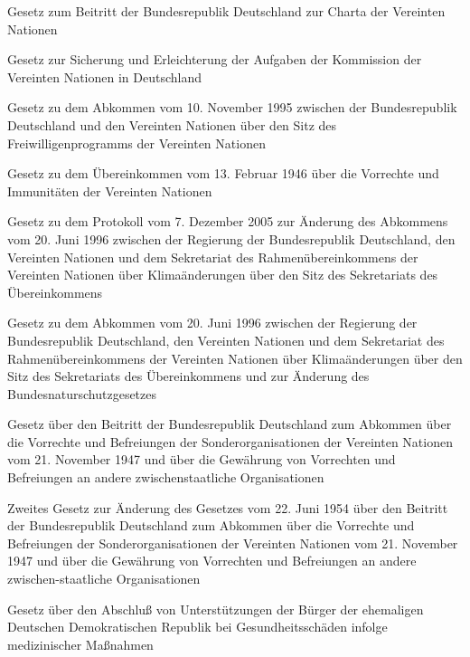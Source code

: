 \item[{UNChG}] Gesetz zum Beitritt der Bundesrepublik Deutschland zur Charta der Vereinten Nationen

\item[{UNErlG}] Gesetz zur Sicherung und Erleichterung der Aufgaben der Kommission der Vereinten Nationen in Deutschland

\item[{UNFreiwProgrAbkG}] Gesetz zu dem Abkommen vom 10. November 1995 zwischen der Bundesrepublik Deutschland und den Vereinten Nationen über den Sitz des Freiwilligenprogramms der Vereinten Nationen

\item[{UNOImmÜbkG}] Gesetz zu dem Übereinkommen vom 13. Februar 1946 über die Vorrechte und Immunitäten der Vereinten Nationen

\item[{UNSekrSitzAbkÄndProtG}] Gesetz zu dem Protokoll vom 7. Dezember 2005 zur Änderung des Abkommens vom 20. Juni 1996 zwischen der Regierung der Bundesrepublik Deutschland, den Vereinten Nationen und dem Sekretariat des Rahmenübereinkommens der Vereinten Nationen über Klimaänderungen über den Sitz des Sekretariats des Übereinkommens

\item[{UNSekrSitzAbkG}] Gesetz zu dem Abkommen vom 20. Juni 1996 zwischen der Regierung der Bundesrepublik Deutschland, den Vereinten Nationen und dem Sekretariat des Rahmenübereinkommens der Vereinten Nationen über Klimaänderungen über den Sitz des Sekretariats des Übereinkommens und zur Änderung des Bundesnaturschutzgesetzes

\item[{UNSOrgVorRAbkG}] Gesetz über den Beitritt der Bundesrepublik Deutschland zum Abkommen über die Vorrechte und Befreiungen der Sonderorganisationen der Vereinten Nationen vom 21. November 1947 und über die Gewährung von Vorrechten und Befreiungen an andere zwischenstaatliche Organisationen

\item[{UNSOrgVorRAbkGÄndG-2}] Zweites Gesetz zur Änderung des Gesetzes vom 22. Juni 1954 über den Beitritt der Bundesrepublik Deutschland zum Abkommen über die Vorrechte und Befreiungen der Sonderorganisationen der Vereinten Nationen vom 21. November 1947 und über die Gewährung von Vorrechten und Befreiungen an andere zwischen-staatliche Organisationen

\item[{UntAbschlG}] Gesetz über den Abschluß von Unterstützungen der Bürger der ehemaligen Deutschen Demokratischen Republik bei Gesundheitsschäden infolge medizinischer Maßnahmen

